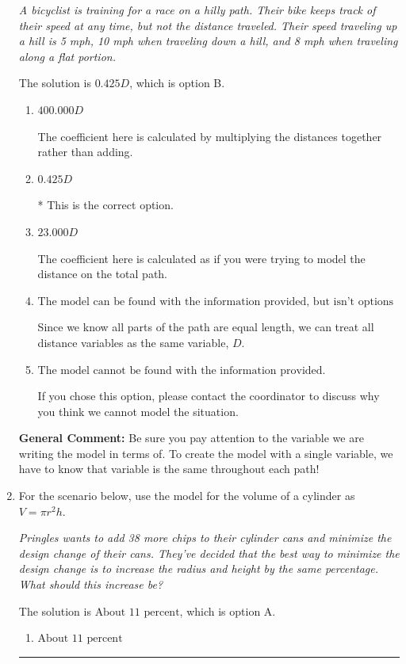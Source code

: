 \documentclass{extbook}[14pt]
\newcommand{\litem}[1]{\item #1

\rule{\textwidth}{0.4pt}}
\begin{document}
\begin{enumerate}
{\begin{center}
    \textit{ A bicyclist is training for a race on a hilly path. Their bike keeps track of their speed at any time, but not the distance traveled. Their speed traveling up a hill is 5 mph, 10 mph when traveling down a hill, and 8 mph when traveling along a flat portion. }
\end{center}
The solution is \( 0.425 D \), which is option B.\begin{enumerate}[label=\Alph*.]
\item \( 400.000 D \)

The coefficient here is calculated by multiplying the distances together rather than adding.
\item \( 0.425 D \)

* This is the correct option.
\item \( 23.000 D \)

The coefficient here is calculated as if you were trying to model the distance on the total path.
\item \( \text{The model can be found with the information provided, but isn't options 1-3.} \)

Since we know all parts of the path are equal length, we can treat all distance variables as the same variable, $D$.
\item \( \text{The model cannot be found with the information provided.} \)

If you chose this option, please contact the coordinator to discuss why you think we cannot model the situation.
\end{enumerate}

\textbf{General Comment:} Be sure you pay attention to the variable we are writing the model in terms of. To create the model with a single variable, we have to know that variable is the same throughout each path!
}
\litem{
For the scenario below, use the model for the volume of a cylinder as $V = \pi r^2 h$.

\begin{center}
    \textit{ Pringles wants to add 38 \text{percent} more chips to their cylinder cans and minimize the design change of their cans. They've decided that the best way to minimize the design change is to increase the radius and height by the same percentage. What should this increase be? }
\end{center}
The solution is \( \text{About } 11 \text{ percent} \), which is option A.\begin{enumerate}[label=\Alph*.]
\item \( \text{About } 11 \text{ percent} \)


\end{enumerate}}
\end{enumerate}
\end{document}
